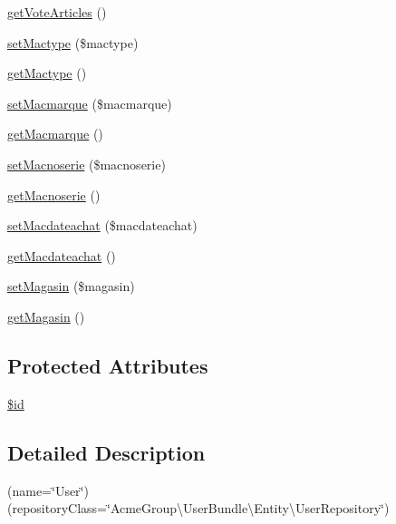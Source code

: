 \begin{DoxyCompactItemize}
\item 
\hyperlink{class_acme_group_1_1_user_bundle_1_1_entity_1_1_user_a525d92dccf79effe253072c4741a95d0}{get\+Vote\+Articles} ()
\item 
\hyperlink{class_acme_group_1_1_user_bundle_1_1_entity_1_1_user_a1c5750836a36c5ca9bcec00939f41521}{set\+Mactype} (\$mactype)
\item 
\hyperlink{class_acme_group_1_1_user_bundle_1_1_entity_1_1_user_a11f17b2a774b3d930a5dc53b38d277db}{get\+Mactype} ()
\item 
\hyperlink{class_acme_group_1_1_user_bundle_1_1_entity_1_1_user_ae41556e91ab554d5b5a16dda55051b7c}{set\+Macmarque} (\$macmarque)
\item 
\hyperlink{class_acme_group_1_1_user_bundle_1_1_entity_1_1_user_a65ec8144b5b3f959822d27bd23f8636c}{get\+Macmarque} ()
\item 
\hyperlink{class_acme_group_1_1_user_bundle_1_1_entity_1_1_user_af4ae00319819b11a4f31606fa43d01fd}{set\+Macnoserie} (\$macnoserie)
\item 
\hyperlink{class_acme_group_1_1_user_bundle_1_1_entity_1_1_user_ade7ef6165af5faee788470c39ceb4f71}{get\+Macnoserie} ()
\item 
\hyperlink{class_acme_group_1_1_user_bundle_1_1_entity_1_1_user_aff58f359b11fe179a4fdb19cf6ec8233}{set\+Macdateachat} (\$macdateachat)
\item 
\hyperlink{class_acme_group_1_1_user_bundle_1_1_entity_1_1_user_a4f8ec14a3c0dfc4a02c484808695dbf8}{get\+Macdateachat} ()
\item 
\hyperlink{class_acme_group_1_1_user_bundle_1_1_entity_1_1_user_a19c16905a5f0587ab62402fff4b1e322}{set\+Magasin} (\$magasin)
\item 
\hyperlink{class_acme_group_1_1_user_bundle_1_1_entity_1_1_user_a82360da6a6a5ee3e0d43a27012fe653f}{get\+Magasin} ()
\end{DoxyCompactItemize}
\subsection*{Protected Attributes}
\begin{DoxyCompactItemize}
\item 
\hyperlink{class_acme_group_1_1_user_bundle_1_1_entity_1_1_user_a493eb0617ea3797fd7bb8982c3351bb6}{\$id}
\end{DoxyCompactItemize}


\subsection{Detailed Description}
(name=\char`\"{}\+User\char`\"{}) (repository\+Class=\char`\"{}\+Acme\+Group\textbackslash{}\+User\+Bundle\textbackslash{}\+Entity\textbackslash{}\+User\+Repository\char`\"{}) 

